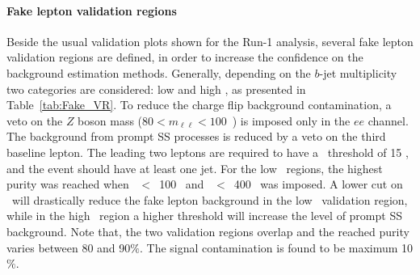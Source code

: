 \paragraph{Fake lepton validation regions\\}
Beside the usual validation plots shown for the Run-1 analysis, several fake lepton validation regions are defined, in order to increase the confidence on the background estimation methods. Generally, depending on the $b$-jet multiplicity two categories are considered: low and high \meff, as presented in Table~\ref{tab:Fake_VR}. To reduce the charge flip background contamination, a veto on the $Z$ boson mass ($80<m_{\ell\ell}<100$~\GeV) is imposed only in the $ee$ channel. The background from prompt SS processes is reduced by a veto on the third baseline lepton. The leading two leptons are required to have a \pt\ threshold of 15 \GeV, and the event should have at least one jet. For the low \meff\ regions, the highest purity was reached when \met~$<$~100 \GeV\ and \meff~$<$~400 \GeV\ was imposed. A lower cut on \meff\ will drastically reduce the fake lepton background in the low \meff\ validation region, while in the high \meff\ region a higher threshold will increase the level of prompt SS background. Note that, the two validation regions overlap and the reached purity varies between 80 and 90$\%$. The signal contamination is found to be maximum 10$\%$.

